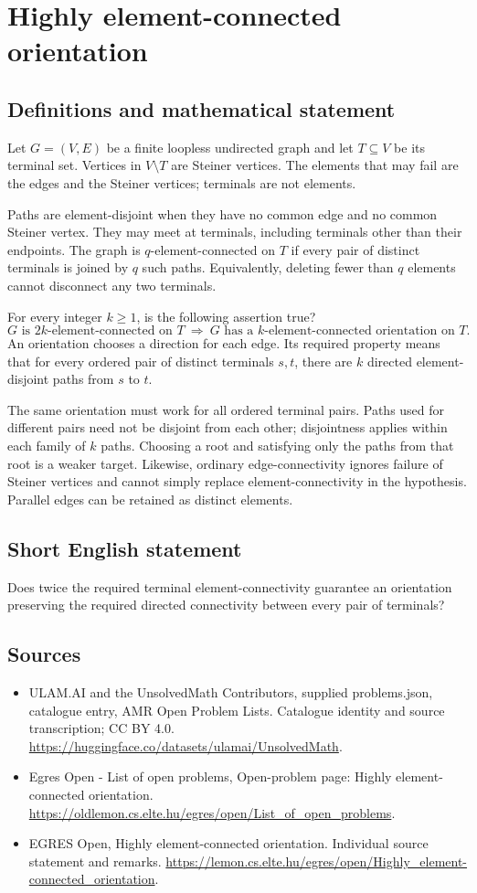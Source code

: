 \documentclass[11pt,a4paper]{article}
\begin{document}
\section*{Highly element-connected orientation}\label{statement}

\subsection{Definitions and mathematical statement}
Let $G=(V,E)$ be a finite loopless undirected graph and let
$T\subseteq V$ be its terminal set. Vertices in $V\setminus T$ are
Steiner vertices. The elements that may fail are the edges and the
Steiner vertices; terminals are not elements.

Paths are element-disjoint when they have no common edge and no
common Steiner vertex. They may meet at terminals, including terminals
other than their endpoints. The graph is $q$-element-connected on $T$
if every pair of distinct terminals is joined by $q$ such paths.
Equivalently, deleting fewer than $q$ elements cannot disconnect any
two terminals.

For every integer $k\ge1$, is the following assertion true?
\[
 G\text{ is }2k\text{-element-connected on }T
 \ \Longrightarrow\
 G\text{ has a }k\text{-element-connected orientation on }T.
\]
An orientation chooses a direction for each edge. Its required property
means that for every ordered pair of distinct terminals $s,t$, there
are $k$ directed element-disjoint paths from $s$ to $t$.

The same orientation must work for all ordered terminal pairs.
Paths used for different pairs need not be disjoint from each other;
disjointness applies within each family of $k$ paths. Choosing a root
and satisfying only the paths from that root is a weaker target.
Likewise, ordinary edge-connectivity ignores failure of Steiner vertices
and cannot simply replace element-connectivity in the hypothesis.
Parallel edges can be retained as distinct elements.
\subsection{Short English statement}
Does twice the required terminal element-connectivity guarantee an orientation preserving the required directed connectivity between every pair of terminals?
\subsection{Sources}
\begin{itemize}
\item[S1] ULAM.AI and the UnsolvedMath Contributors, supplied problems.json, catalogue entry, AMR Open Problem Lists. Catalogue identity and source transcription; CC BY 4.0.
\url{https://huggingface.co/datasets/ulamai/UnsolvedMath}.
\item[S2] Egres Open - List of open problems, Open-problem page: Highly element-connected orientation. 
\url{https://oldlemon.cs.elte.hu/egres/open/List_of_open_problems}.
\item[S3] EGRES Open, Highly element-connected orientation. Individual source statement and remarks.
\url{https://lemon.cs.elte.hu/egres/open/Highly_element-connected_orientation}.
\end{itemize}
\end{document}
